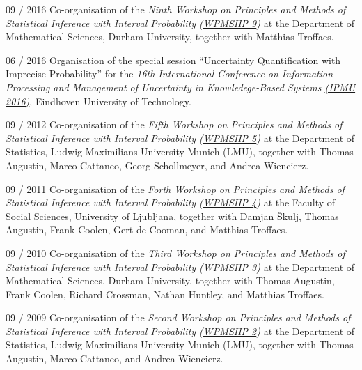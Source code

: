 \documentclass[a4paper]{simplecv}
\begin{document}
\begin{topic}
\item[09 / 2016] Co-organisation of the \emph{Ninth Workshop on Principles and Methods of Statistical Inference with Interval Probability (\href{http://www.maths.dur.ac.uk/users/matthias.troffaes/wpmsiip2016/index.html}{WPMSIIP 9})}
                 at the Department of Mathematical Sciences, Durham University,
                 together with Matthias Troffaes.

\item[06 / 2016] Organisation of the special session ``Uncertainty Quantification with Imprecise Probability''
                 for the \emph{16th International Conference on Information Processing and Management of Uncertainty in Knowledege-Based Systems \href{http://www.ipmu2016.org}{(IPMU 2016)}},
                 Eindhoven University of Technology.

\item[09 / 2012] Co-organisation of the \emph{Fifth Workshop on Principles and Methods of Statistical Inference with Interval Probability (\href{http://www.statistik.lmu.de/institut/ag/statsoz_neu/research/WPMSIIP_2012/}{WPMSIIP 5})}
                 at the Department of Statistics, Ludwig-Maximilians-University Munich (LMU),
                 together with Thomas Augustin, Marco Cattaneo, Georg Schollmeyer, and Andrea Wiencierz.
                 
\item[09 / 2011] Co-organisation of the \emph{Forth Workshop on Principles and Methods of Statistical Inference with Interval Probability (\href{http://wpmsiip2011.fdvinfo.net/c/646/Information/}{WPMSIIP 4})}
                 at the Faculty of Social Sciences, University of Ljubljana,
                 together with Damjan \v{S}kulj, Thomas Augustin, Frank Coolen, Gert de Cooman, and Matthias Troffaes.

\item[09 / 2010] Co-organisation of the \emph{Third Workshop on Principles and Methods of Statistical Inference with Interval Probability (\href{http://www.maths.dur.ac.uk/users/matthias.troffaes/wpmsiip2010/}{WPMSIIP 3})}
                 at the Department of Mathematical Sciences, Durham University,
                 together with Thomas Augustin, Frank Coolen, Richard Crossman, Nathan Huntley, and Matthias Troffaes.

\item[09 / 2009] Co-organisation of the \emph{Second Workshop on Principles and Methods of Statistical Inference with Interval Probability (\href{http://www.stat.uni-muenchen.de/~walter/workshop0909/}{WPMSIIP 2})}
                 at the Department of Statistics, Ludwig-Maximilians-University Munich (LMU),
                 together with Thomas Augustin, Marco Cattaneo, and Andrea Wiencierz.
\end{topic}
\end{document}
